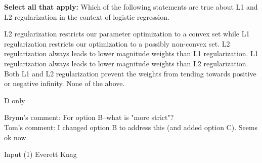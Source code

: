 \begin{questions}
    
\question[1] \textbf{Select all that apply:} Which of the following statements are true about L1 and L2 regularization in the context of logistic regression.
    {%
    \checkboxchar{$\Box$} %
    \begin{checkboxes}
     \choice L2 regularization restricts our parameter optimization to a convex set while L1 regularization restricts our optimization to a possibly non-convex set.
     \choice L2 regularization always leads to lower magnitude weights than L1 regularization.     
     \choice L1 regularization always leads to lower magnitude weights than L2 regularization.
     \choice Both L1 and L2 regularization prevent the weights from tending towards positive or negative infinity.
     \choice None of the above.
    \end{checkboxes}
    }
    \begin{soln}
    D only
    
    Brynn's comment: For option B--what is "more strict"?
    \\ Tom's comment: I changed option B to address this (and added option C).  Seems ok now.
    \end{soln}
    \begin{qauthor}
    Input (1) Everett Knag 
    \end{qauthor}

\end{questions}


